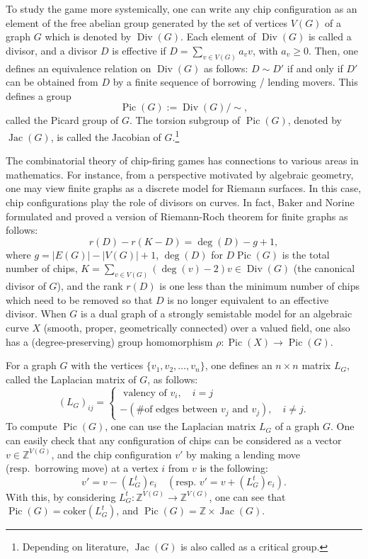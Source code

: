 \documentclass[11pt,reqno]{amsart}
\DeclareMathOperator{\Pic}{Pic}
\DeclareMathOperator{\Jac}{Jac}
\DeclareMathOperator{\Div}{Div}
\theoremstyle{definition}
\theoremstyle{plain}
\begin{document}
To study the game more systemically, one can write any chip configuration as an element of the free abelian group generated by the set of vertices $V(G)$ of a graph $G$ which is denoted by $\Div(G)$. Each element of $\Div(G)$ is called a divisor, and a divisor $D$ is effective if $D=\sum_{v \in V(G)} a_vv$, with $a_v \geq 0$. Then, one defines an equivalence relation on $\Div(G)$ as follows: $D\sim D'$ if and only if $D'$ can be obtained from $D$ by a finite sequence of borrowing / lending movers. This defines a group 
\[
\Pic(G):=\Div(G)/\sim,
\]
called the Picard group of $G$. The torsion subgroup of $\Pic(G)$, denoted by $\Jac(G)$, is called the Jacobian of $G$.\footnote{Depending on literature, $\Jac(G)$ is also called as a critical group.}

The combinatorial theory of chip-firing games has connections to various areas in mathematics. For instance, from a perspective motivated by algebraic geometry, one may view finite graphs as a discrete model for Riemann surfaces. In this case, chip configurations play the role of divisors on curves. In fact, Baker and Norine \cite{baker2007riemann} formulated and proved a version of Riemann-Roch theorem for finite graphs as follows:
\[
r(D) - r(K-D) = \deg(D) -g+1,
\]
where $g=|E(G)|-|V(G)|+1$, $\deg(D)$ for $D \Pic(G)$ is the total number of chips, $K=\sum_{v \in V(G)} (\deg(v)-2)v \in \Div(G)$ (the canonical divisor of $G$), and the rank $r(D)$ is one less than the minimum number of chips which need to be removed so that $D$ is no longer equivalent to an effective divisor. When $G$ is a dual graph of a strongly semistable model for an algebraic curve $X$ (smooth, proper, geometrically connected) over a valued field, one also has a (degree-preserving) group homomorphism $\rho:\Pic(X) \to \Pic(G)$. 

For a graph $G$ with the vertices $\{v_1,v_2,\dots,v_n\}$, one defines an $n\times n$ matrix $L_G$, called the Laplacian matrix of $G$, as follows:
\[
(L_G)_{ij}=\begin{cases}
\textrm{ valency of $v_i$}, \quad i=j\\
-(\textrm{\# of edges between $v_j$ and $v_j$}), \quad i \neq j.
\end{cases}
\]
To compute $\Pic(G)$, one can use the Laplacian matrix $L_G$ of a graph $G$. One can easily check that any configuration of chips can be considered as a vector $v \in \mathbb{Z}^{V(G)}$, and the chip configuration $v'$ by making a lending move (resp.~borrowing move) at a vertex $i$ from $v$ is the following:
\begin{equation}\label{eq: introduc1}
v'=v - (L_G^t)e_i \quad (\textrm{resp.~} v'=v + (L_G^t)e_i).
\end{equation}
With this, by considering $L_G^t:\mathbb{Z}^{V(G)} \to \mathbb{Z}^{V(G)}$, one can see that $\Pic(G)=\textrm{coker}(L_G^t)$, and $\Pic(G)=\mathbb{Z}\times \Jac(G)$. 
\end{document}
